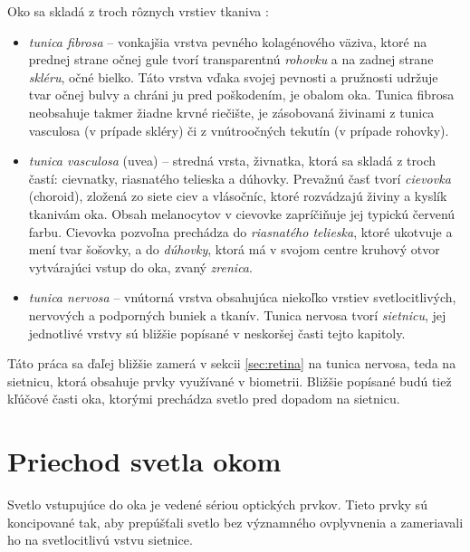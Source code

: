Oko sa skladá z troch rôznych vrstiev tkaniva \cite{zloz_oka}:
\begin{itemize}
\item \emph{tunica fibrosa} -- vonkajšia vrstva pevného kolagénového väziva, ktoré na prednej strane očnej gule tvorí transparentnú \emph{rohovku} a na zadnej strane \emph{skléru}, očné bielko. Táto vrstva vďaka svojej pevnosti a pružnosti udržuje tvar očnej bulvy a chráni ju pred poškodením, je obalom oka. Tunica fibrosa neobsahuje takmer žiadne krvné riečište, je zásobovaná živinami z tunica vasculosa (v prípade skléry) či z vnútroočných tekutín (v prípade rohovky).
\item \emph{tunica vasculosa} (uvea) -- stredná vrsta, živnatka, ktorá sa skladá z troch častí: cievnatky, riasnatého telieska a dúhovky. Prevažnú časť tvorí \emph{cievovka} (choroid), zložená zo siete ciev a vlásočníc, ktoré rozvádzajú živiny a kyslík tkanivám oka. Obsah melanocytov v cievovke zapríčiňuje jej typickú červenú farbu. Cievovka pozvoľna prechádza do \emph{riasnatého telieska}, ktoré ukotvuje a mení tvar šošovky, a do \emph{dúhovky}, ktorá má v svojom centre kruhový otvor vytvárajúci vstup do oka, zvaný \emph{zrenica}.
\item \emph{tunica nervosa} -- vnútorná vrstva obsahujúca niekoľko vrstiev svetlocitlivých, nervových a podporných buniek a tkanív. Tunica nervosa tvorí \emph{sietnicu}, jej jednotlivé vrstvy sú bližšie popísané v neskoršej časti tejto kapitoly.
\end{itemize}

Táto práca sa ďaľej bližšie zamerá v sekcii \ref{sec:retina} na tunica nervosa, teda na sietnicu, ktorá obsahuje prvky využívané v biometrii. Bližšie popísané budú tiež kľúčové časti oka, ktorými prechádza svetlo pred dopadom na sietnicu.

\section{Priechod svetla okom}
Svetlo vstupujúce do oka je vedené sériou optických prvkov. Tieto prvky sú koncipované tak, aby prepúšťali svetlo bez významného ovplyvnenia a zameriavali ho na svetlocitlivú vstvu sietnice.


